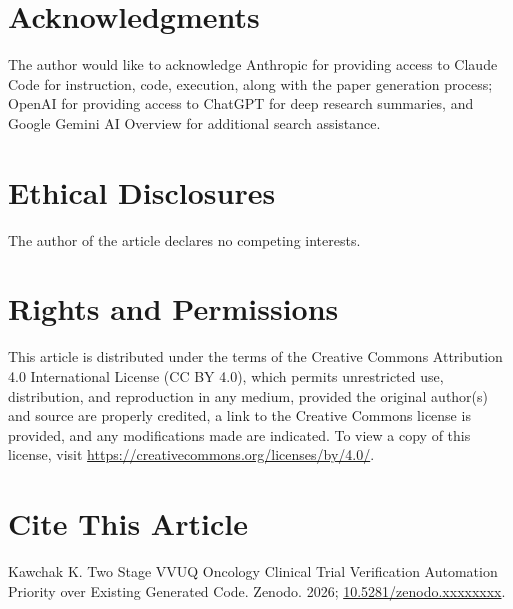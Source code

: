
{}
\section*{Acknowledgments}
\label{sec:acknowledgments}

The author would like to acknowledge Anthropic for providing access to Claude
Code for instruction, code, execution, along with the paper generation process;
OpenAI for providing access to ChatGPT for deep research summaries, and Google
Gemini AI Overview for additional search assistance.

{}
\section*{Ethical Disclosures}
\label{sec:ethics}

The author of the article declares no competing interests.

{}
\section*{Rights and Permissions}
\label{sec:rights}

This article is distributed under the terms of the Creative Commons Attribution
4.0 International License (CC BY 4.0), which permits unrestricted use,
distribution, and reproduction in any medium, provided the original author(s)
and source are properly credited, a link to the Creative Commons license is
provided, and any modifications made are indicated. To view a copy of this
license, visit \url{https://creativecommons.org/licenses/by/4.0/}.

{}
\section*{Cite This Article}
\label{sec:cite}

Kawchak K. Two Stage VVUQ Oncology Clinical Trial Verification Automation
Priority over Existing Generated Code. Zenodo. 2026;
\href{https://doi.org/10.5281/zenodo.xxxxxxxx}{10.5281/zenodo.xxxxxxxx}.

